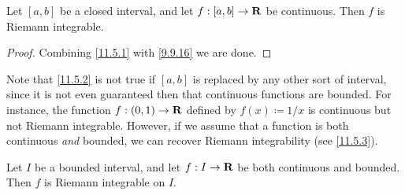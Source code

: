 \begin{corollary}\label{11.5.2}
  Let \([a, b]\) be a closed interval, and let \(f : [a, b] \to \mathbf{R}\) be continuous.
  Then \(f\) is Riemann integrable.
\end{corollary}

\begin{proof}
  Combining \cref{11.5.1} with \cref{9.9.16} we are done.
\end{proof}

\begin{note}
  Note that \cref{11.5.2} is not true if \([a, b]\) is replaced by any other sort of interval, since it is not even guaranteed then that continuous functions are bounded.
  For instance, the function \(f : (0, 1) \to \mathbf{R}\) defined by \(f(x) \coloneqq 1 / x\) is continuous but not Riemann integrable.
  However, if we assume that a function is both continuous \emph{and} bounded, we can recover Riemann integrability (see \cref{11.5.3}).
\end{note}

\begin{proposition}\label{11.5.3}
  Let \(I\) be a bounded interval, and let \(f : I \to \mathbf{R}\) be both continuous and bounded.
  Then \(f\) is Riemann integrable on \(I\).
\end{proposition}

